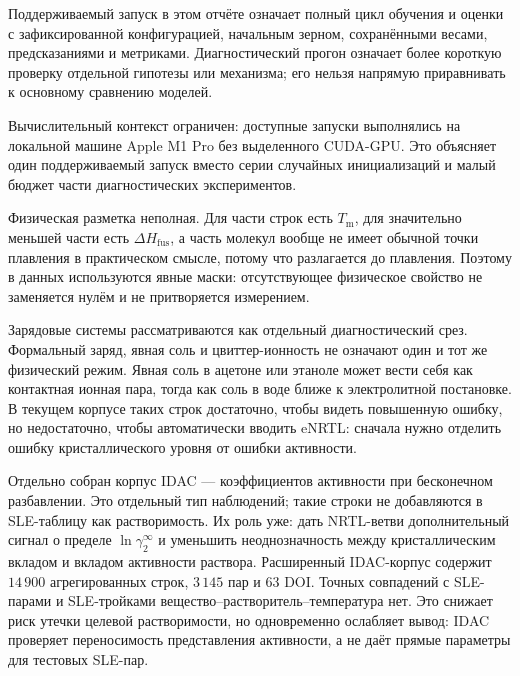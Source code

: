 \documentclass[11pt]{article}
\newcommand{\Tm}{T_{\mathrm m}}
\newcommand{\dHfus}{\Delta H_{\mathrm{fus}}}
\theoremstyle{definition}
\begin{document}
Поддерживаемый запуск в этом отчёте означает полный цикл обучения и оценки с зафиксированной конфигурацией, начальным зерном, сохранёнными весами, предсказаниями и метриками. Диагностический прогон означает более короткую проверку отдельной гипотезы или механизма; его нельзя напрямую приравнивать к основному сравнению моделей.

Вычислительный контекст ограничен: доступные запуски выполнялись на локальной машине Apple M1 Pro без выделенного CUDA-GPU. Это объясняет один поддерживаемый запуск вместо серии случайных инициализаций и малый бюджет части диагностических экспериментов.

Физическая разметка неполная. Для части строк есть $\Tm$, для значительно меньшей части есть $\dHfus$, а часть молекул вообще не имеет обычной точки плавления в практическом смысле, потому что разлагается до плавления. Поэтому в данных используются явные маски: отсутствующее физическое свойство не заменяется нулём и не притворяется измерением.

Зарядовые системы рассматриваются как отдельный диагностический срез. Формальный заряд, явная соль и цвиттер-ионность не означают один и тот же физический режим. Явная соль в ацетоне или этаноле может вести себя как контактная ионная пара, тогда как соль в воде ближе к электролитной постановке. В текущем корпусе таких строк достаточно, чтобы видеть повышенную ошибку, но недостаточно, чтобы автоматически вводить eNRTL: сначала нужно отделить ошибку кристаллического уровня от ошибки активности.

Отдельно собран корпус IDAC --- коэффициентов активности при бесконечном разбавлении. Это отдельный тип наблюдений; такие строки не добавляются в SLE-таблицу как растворимость. Их роль уже: дать NRTL-ветви дополнительный сигнал о пределе $\ln\gamma_2^\infty$ и уменьшить неоднозначность между кристаллическим вкладом и вкладом активности раствора. Расширенный IDAC-корпус содержит $14\,900$ агрегированных строк, $3\,145$ пар и $63$ DOI. Точных совпадений с SLE-парами и SLE-тройками вещество--растворитель--температура нет. Это снижает риск утечки целевой растворимости, но одновременно ослабляет вывод: IDAC проверяет переносимость представления активности, а не даёт прямые параметры для тестовых SLE-пар.
\end{document}
